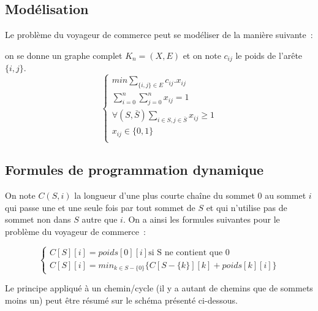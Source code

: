 \subsection{Modélisation}

Le problème du voyageur de commerce peut se modéliser de la manière
suivante~:


on se donne un graphe complet $K_n=(X,E)$ et on note $c_{ij}$ le poids
de l'arête $\{i,j\}$.
\begin{equation}
\begin{cases}
min \sum_{\{i, j\} \in E} c_{ij}.x_{ij} \\
\sum_{i=0}^n \sum_{j=0}^n x_{ij} = 1 \\
\forall (S, \bar{S}) \sum_{i \in S, j \in \bar{S}} x_{ij} \geq 1 \\
x_{ij} \in \{0, 1\} \\
\end{cases}
\end{equation}

\subsection{Formules de programmation dynamique}

On note $C(S,i)$ la longueur d'une plus courte chaîne du sommet $0$ au
sommet $i$ qui passe une et une seule fois par tout sommet de $S$ et
qui n'utilise pas de sommet non dans $S$ autre que $i$. On a ainsi les
formules suivantes pour le problème du voyageur de commerce~:

\begin{equation}
\begin{cases}
C[S][i] = poids[0][i] \text{si S ne contient que $0$} \\
C[S][i] = min_{k \in S - \{ 0 \}} \{ C[S- \{ k \}][k] + poids[k][i]  \}
\end{cases}
\end{equation}

Le principe appliqué à un chemin/cycle (il y a autant de chemins que de
sommets moins un) peut être résumé sur le schéma présenté ci-dessous.

